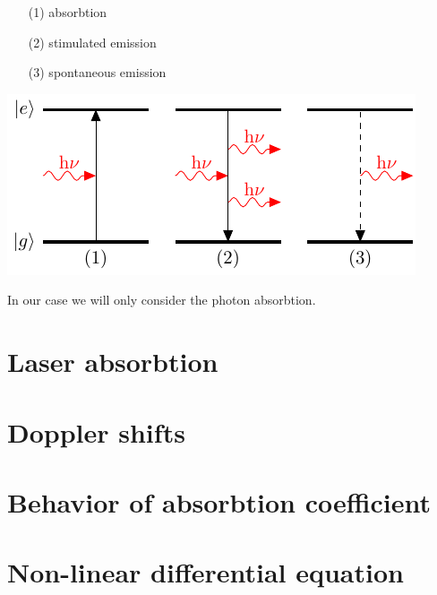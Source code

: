\begin{minipage}[c][][c]{.35\textwidth}
\begin{itemize}
\item[(1)] absorbtion
\item[(2)] stimulated emission
\item[(3)] spontaneous emission
\end{itemize}
\end{minipage}
\hfill
\begin{minipage}[c]{.55\textwidth}
\includegraphics[width=\textwidth]{twolevel}
\end{minipage}
\bigskip

In our case we will only consider the photon absorbtion. 

\pagebreak
\section{Laser absorbtion}  %

\pagebreak
\section{Doppler shifts}  %

\pagebreak
\section{Behavior of absorbtion coefficient}  %

\pagebreak
\section{Non-linear differential equation}  %

\pagebreak